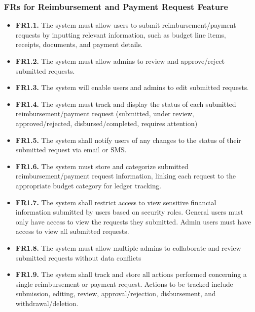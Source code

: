 \documentclass[12pt]{article}
\begin{document}
\subsubsection{FRs for Reimbursement and Payment Request Feature}

\begin{itemize}
    \item \textbf{FR1.1.} The system must allow users to submit reimbursement/payment requests by inputting relevant information, such as budget line items, receipts, documents, and payment details.
    \item \textbf{FR1.2.} The system must allow admins to review and approve/reject submitted requests.
    \item \textbf{FR1.3.} The system will enable users and admins to edit submitted requests.
    \item \textbf{FR1.4.} The system must track and display the status of each submitted reimbursement/payment request (submitted, under review, approved/rejected, disbursed/completed, requires attention)
    \item \textbf{FR1.5.} The system shall notify users of any changes to the status of their submitted request via email or SMS.
    \item \textbf{FR1.6.} The system must store and categorize submitted reimbursement/payment request information, linking each request to the appropriate budget category for ledger tracking.
    \item \textbf{FR1.7.} The system shall restrict access to view sensitive financial information submitted by users based on security roles. General users must only have access to view the requests they submitted. Admin users must have access to view all submitted requests.
    \item \textbf{FR1.8.} The system must allow multiple admins to collaborate and review submitted requests without data conflicts
    \item \textbf{FR1.9.} The system shall track and store all actions performed concerning a single reimbursement or payment request. Actions to be tracked include submission, editing, review, approval/rejection, disbursement, and withdrawal/deletion.
\end{itemize}
\end{document}
